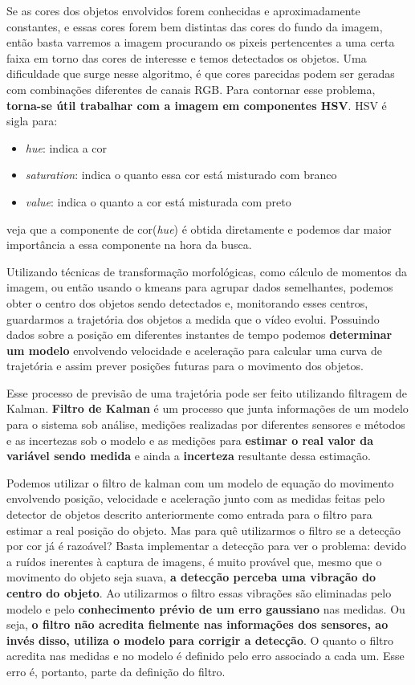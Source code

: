 \documentclass[journal]{IEEEtran}
\begin{document}
Se as cores dos objetos envolvidos forem conhecidas e aproximadamente 
constantes, e essas cores forem bem distintas das cores do fundo da 
imagem, então basta varremos a imagem procurando os pixeis 
pertencentes a uma certa faixa em torno das cores de interesse e 
temos detectados os objetos.
Uma dificuldade que surge nesse algoritmo, é que cores parecidas podem
ser geradas com combinações diferentes de canais RGB. Para contornar 
esse problema, \textbf{torna-se
útil trabalhar com a imagem em componentes HSV}. HSV é sigla para:
\begin{itemize}
 \item 
 \textit{hue}: indica a cor
 \item 
 \textit{saturation}: indica o quanto essa cor está misturado com 
branco
 \item
 \textit{value}: indica o quanto a cor está misturada com preto
\end{itemize}
veja que a componente de cor(\textit{hue}) é obtida diretamente e 
podemos dar maior importância a essa componente na hora da busca.


Utilizando técnicas de transformação morfológicas, como cálculo de 
momentos da imagem, ou então usando o kmeans para agrupar dados 
semelhantes, podemos obter o centro dos objetos sendo detectados e,
monitorando esses centros, guardarmos a trajetória dos objetos a 
medida que o vídeo evolui. Possuindo dados sobre a posição em 
diferentes instantes de tempo podemos \textbf{determinar um modelo} 
envolvendo velocidade e aceleração para calcular uma curva de 
trajetória e assim prever posições futuras para o movimento dos 
objetos.

Esse processo de previsão de uma trajetória pode ser feito utilizando
filtragem de Kalman. \textbf{Filtro de Kalman} é um processo que 
junta informações de um modelo para o sistema sob análise, medições 
realizadas por diferentes sensores e métodos e as incertezas sob o 
modelo e as medições para \textbf{estimar o real valor da variável 
sendo 
medida} e ainda a \textbf{incerteza} resultante dessa estimação.

Podemos
utilizar o filtro de kalman com um modelo de equação do movimento 
envolvendo posição, velocidade e aceleração junto com as medidas 
feitas pelo detector de objetos descrito anteriormente como entrada 
para o filtro para estimar a real posição do objeto. Mas para quê 
utilizarmos o filtro se a detecção por cor já é razoável? Basta 
implementar a detecção para ver o problema: devido a ruídos inerentes
à captura de imagens, é muito provável que, mesmo que o movimento do 
objeto seja suava, \textbf{a detecção perceba uma vibração do centro 
do 
objeto}. Ao utilizarmos o filtro essas vibrações são eliminadas pelo 
modelo e pelo \textbf{conhecimento prévio de um erro gaussiano} nas 
medidas.
Ou seja, \textbf{o filtro não acredita fielmente nas informações dos 
sensores,
ao invés disso, utiliza o modelo para corrigir a detecção}. O quanto 
o filtro acredita nas medidas e no modelo é definido pelo erro 
associado a cada um. Esse erro é, portanto, parte da definição do 
filtro.
\end{document}
